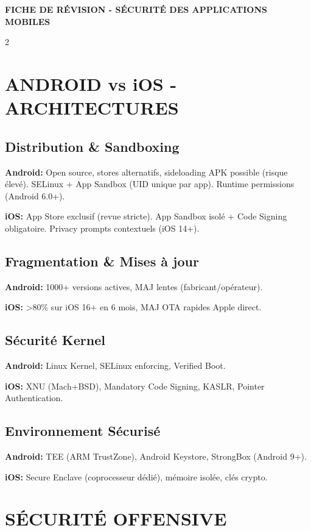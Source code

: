 \documentclass[9pt,a4paper]{extarticle}
\begin{document}
\begin{center}
\textbf{\large FICHE DE RÉVISION - SÉCURITÉ DES APPLICATIONS MOBILES}
\end{center}

\begin{multicols}{2}

\section*{ANDROID vs iOS - ARCHITECTURES}

\subsection*{Distribution \& Sandboxing}
\textbf{Android:} Open source, stores alternatifs, sideloading APK possible (risque élevé). SELinux + App Sandbox (UID unique par app). Runtime permissions (Android 6.0+).

\textbf{iOS:} App Store exclusif (revue stricte). App Sandbox isolé + Code Signing obligatoire. Privacy prompts contextuels (iOS 14+).

\subsection*{Fragmentation \& Mises à jour}
\textbf{Android:} 1000+ versions actives, MAJ lentes (fabricant/opérateur).

\textbf{iOS:} >80\% sur iOS 16+ en 6 mois, MAJ OTA rapides Apple direct.

\subsection*{Sécurité Kernel}
\textbf{Android:} Linux Kernel, SELinux enforcing, Verified Boot.

\textbf{iOS:} XNU (Mach+BSD), Mandatory Code Signing, KASLR, Pointer Authentication.

\subsection*{Environnement Sécurisé}
\textbf{Android:} TEE (ARM TrustZone), Android Keystore, StrongBox (Android 9+).

\textbf{iOS:} Secure Enclave (coprocesseur dédié), mémoire isolée, clés crypto.

\section*{SÉCURITÉ OFFENSIVE}


\end{multicols}
\end{document}
